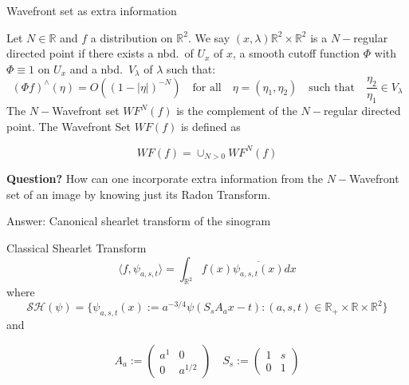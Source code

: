 \begin{frame}{Wavefront set as extra information}
\begin{definition}
Let $N\in\mathbb{R}$ and $f$ a distribution on $\mathbb{R}^2$. We say $(x,\lambda)\mathbb{R}^2\times \mathbb{R}^2$ is a $N-$regular directed point if there exists a nbd.\ of $U_x$ of $x$, a smooth cutoff function $\Phi$ with $\Phi\equiv 1$ on $U_x$ and a nbd.\ $V_{\lambda}$ of $\lambda$ such that:
$$
(\Phi f)^{\wedge}(\eta)=O((1-|\eta|)^{-N}) \quad \text{for all}\quad \eta=(\eta_1,\eta_2) \quad \text{such that}\quad \frac{\eta_2}{\eta_1}\in V_{\lambda}
$$
The $N-$Wavefront set $WF^N(f)$ is the complement of the $N-$regular directed point. The Wavefront Set $WF(f)$ is defined as 

\begin{equation}
\label{eq:Wavefront-set}
WF(f)=\cup_{N>0}WF^N(f)
\end{equation}
\end{definition}
\textbf{Question?} How can one incorporate extra information from the $N-$Wavefront set of an image by knowing just its Radon Transform.
\end{frame}

\begin{frame}{Answer: Canonical shearlet transform of the sinogram}
\begin{block}{Classical Shearlet Transform}
$$
\langle f,\psi_{a,s,t}\rangle =\int_{\mathbb{R}^2}f(x)\overline{\psi_{a,s,t}(x)}dx
$$
where
$$
\mathcal{SH}(\psi)=\{\psi_{a,s,t}(x):=a^{-3/4}\psi (S_sA_ax-t):(a,s,t)\in \mathbb{R}_+\times\mathbb{R}\times\mathbb{R}^2\}
$$
and

$$
A_a:=
\left(
\begin{matrix}
a^1 & 0 \\
0 & a^{1/2}
\end{matrix}
\right)
\quad
S_s:=
\left(
\begin{matrix}
1 & s \\
0 & 1
\end{matrix}
\right)
$$
\end{block}
\end{frame}


